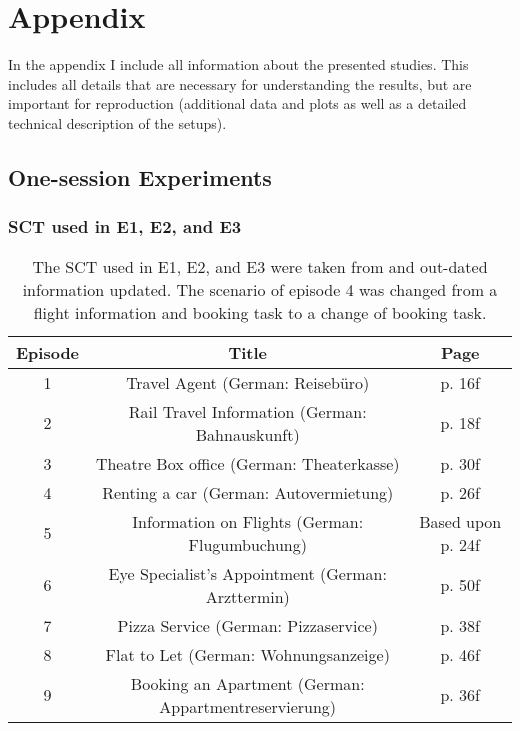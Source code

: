 \chapter{Appendix}\label{chap:appendix}
\begin{chapter-abstract}
In the appendix I include all information about the presented studies.
This includes all details that are necessary for understanding the results, but are important for reproduction (additional data and plots as well as a detailed technical description of the setups).
\end{chapter-abstract}


\section{One-session Experiments}

\subsection{\acs{SCT} used in E1, E2, and E3}
\begin{table}[h]
	\centering
	\begin{tabular}{c|c|c}
	Episode & Title & Page \\
	\hline
	1 & Travel Agent (German: Reisebüro) & p. 16f \\
	2 & Rail Travel Information (German: Bahnauskunft) & p. 18f \\
	3 & Theatre Box office (German: Theaterkasse) & p. 30f \\
	4 & Renting a car (German: Autovermietung) & p. 26f \\
	5 & Information on Flights (German: Flugumbuchung) & Based upon p. 24f \\
	6 & Eye Specialist's Appointment (German: Arzttermin) & p. 50f \\
	7 & Pizza Service (German: Pizzaservice) & p. 38f \\
	8 & Flat to Let (German: Wohnungsanzeige) & p. 46f \\
	9 & Booking an Apartment (German: Appartmentreservierung) & p. 36f \\
	\end{tabular}
	\caption{The \acs{SCT} used in E1, E2, and E3 were taken from \cite{itu-t_p.805:_2007} and out-dated information updated. The scenario of episode 4 was changed from a flight information and booking task to a change of booking task.}
	\label{tab:appendix:labsct}
\end{table}

